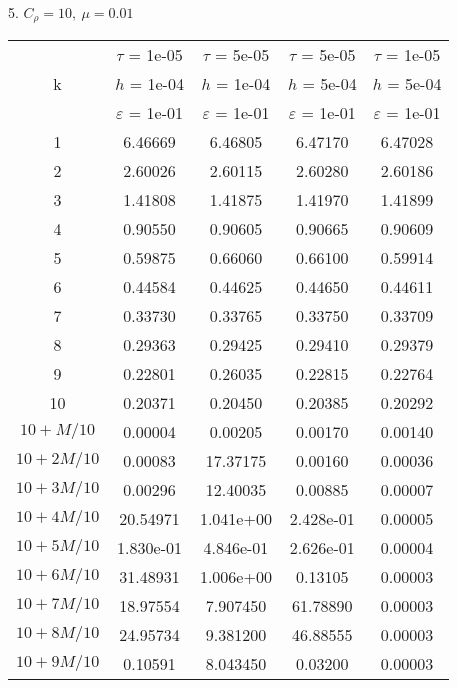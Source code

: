 5. $C_{\rho} = 10, \ \mu = 0.01$
\begin{center}
	\begin{tabular}{ |c|c|c|c|c| } 
		\hline
		& $\tau$ = 1e-05 & $\tau$ = 5e-05 & $\tau$ = 5e-05 & $\tau$ = 1e-05 \\ 
		k & $h$ = 1e-04 & $h$ = 1e-04 & $h$ = 5e-04 & $h$ = 5e-04 \\ 
		& $\varepsilon$ = 1e-01 & $\varepsilon$ = 1e-01 & $\varepsilon$ = 1e-01 & $\varepsilon$ = 1e-01 \\ 
		\hline
		1 & 6.46669 & 6.46805 & 6.47170 & 6.47028 \\
		\hline
		2 & 2.60026 & 2.60115 & 2.60280 & 2.60186 \\
		\hline
		3 & 1.41808 & 1.41875 & 1.41970 & 1.41899 \\
		\hline
		4 & 0.90550 & 0.90605 & 0.90665 & 0.90609 \\
		\hline
		5 & 0.59875 & 0.66060 & 0.66100 & 0.59914 \\
		\hline
		6 & 0.44584 & 0.44625 & 0.44650 & 0.44611 \\
		\hline
		7 & 0.33730 & 0.33765 & 0.33750 & 0.33709 \\
		\hline
		8 & 0.29363 & 0.29425 & 0.29410 & 0.29379 \\
		\hline
		9 & 0.22801 & 0.26035 & 0.22815 & 0.22764 \\
		\hline
		10 & 0.20371 & 0.20450 & 0.20385 & 0.20292 \\
		\hline
		$10 + M/10$ & 0.00004 & 0.00205 & 0.00170 & 0.00140 \\
		\hline
		$10 + 2M/10$ & 0.00083 & 17.37175 & 0.00160 & 0.00036 \\
		\hline
		$10 + 3M/10$ & 0.00296 & 12.40035 & 0.00885 & 0.00007 \\
		\hline
		$10 + 4M/10$ & 20.54971 & 1.041e+00 & 2.428e-01 & 0.00005 \\
		\hline
		$10 + 5M/10$ & 1.830e-01 & 4.846e-01 & 2.626e-01 & 0.00004 \\
		\hline
		$10 + 6M/10$ & 31.48931 & 1.006e+00 & 0.13105 & 0.00003 \\
		\hline
		$10 + 7M/10$ & 18.97554 & 7.907450 & 61.78890 & 0.00003 \\
		\hline
		$10 + 8M/10$ & 24.95734 & 9.381200 & 46.88555 & 0.00003 \\
		\hline
		$10 + 9M/10$ & 0.10591 & 8.043450 & 0.03200 & 0.00003 \\
		\hline
	\end{tabular}
\end{center}

